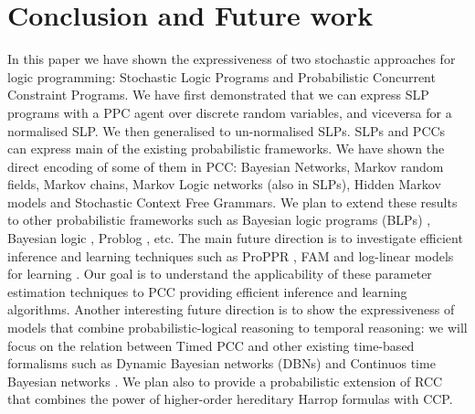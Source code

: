 \documentclass[letterpaper]{article}
\theoremstyle{plain}
\theoremstyle{definition}
\theoremstyle{remark}
\theoremstyle{definition}
\begin{document}


\section{Conclusion and Future work}
In this paper we have shown the expressiveness of two stochastic approaches for logic programming: Stochastic Logic Programs and Probabilistic Concurrent Constraint Programs.
We have first demonstrated that we can express SLP programs with a PPC agent over discrete random variables, and viceversa for a normalised SLP. We then generalised to un-normalised SLPs.
SLPs and PCCs can express main of the existing probabilistic frameworks. We have shown the direct encoding of some of them in PCC: Bayesian Networks, Markov random fields, Markov chains, Markov Logic networks (also in SLPs), Hidden Markov models and Stochastic Context Free Grammars.
We plan to extend these results to other probabilistic frameworks such as Bayesian logic programs (BLPs)  \cite{LogicBN,LogicBN_1}, Bayesian logic \cite{BLOG}, Problog \cite{ProbLog_original}, etc.
The main future direction is to investigate efficient inference and learning techniques such as ProPPR \cite{proppr_article,proppr_summary,proppr_journal}, FAM \cite{SLPcussens2001} and log-linear models for learning \cite{cussens_1999}. Our goal is to understand the applicability of these parameter estimation techniques to PCC providing efficient inference and learning algorithms.
Another interesting future direction is to show the expressiveness of models that combine probabilistic-logical reasoning  to temporal reasoning: we will focus on the relation between Timed PCC \cite{PCC} and other existing time-based formalisms such as Dynamic Bayesian networks (DBNs) \cite{dynamicBN} and Continuos time Bayesian networks \cite{timeBN}.
We plan also to provide a probabilistic extension of  RCC \cite{RCC} that combines the power of higher-order hereditary Harrop formulas with CCP.


\newpage
 

\end{document}
